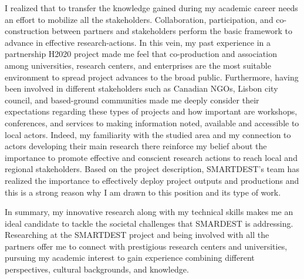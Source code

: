\begin{comment}


My expertise in Geographic Information Science (GIScience), planning, and social theory allow me to teach courses in digital geographies, qualitative and quantitative methods, and GIS, as well as fundamentals in programming language such as SQL and Python. Mixing methods and making associations between cutting-edge tools and theoretical frameworks, my classrooms shift between pragmatic and theoretical perspectives to be able to keep simple and complex overviews needed for the geographical inquiry. Furthermore, I have experience supervising students, helping them to reach their maximum potential by inspiring guiding them through an independent research project.\par

\end{comment}


I realized that to transfer the knowledge gained during my academic career needs an effort to mobilize all the stakeholders. Collaboration, participation, and co-construction between partners and stakeholders perform the basic framework to advance in effective research-actions. In this vein, my past experience in a partnership H2020 project made me feel that co-production and association among universities, research centers, and enterprises are the most suitable environment to spread project advances to the broad public. Furthermore, having been involved in different stakeholders such as Canadian NGOs, Lisbon city council, and based-ground communities made me deeply consider their expectations regarding these types of projects and how important are workshops, conferences, and services to making information noted, available and accessible to local actors. Indeed, my familiarity with the studied area and my connection to actors developing their main research there reinforce my belief about the importance to promote effective and conscient research actions to reach local and regional stakeholders. Based on the project description, SMARTDEST's team has realized the importance to effectively deploy project outputs and productions and this is a strong reason why I am drawn to this position and its type of work.\par


In summary, my innovative research along with my technical skills makes me an ideal candidate to tackle the societal challenges that SMARDEST is addressing. Researching at the SMARTDEST project and being involved with all the partners offer me to connect with prestigious research centers and universities, pursuing my academic interest to gain experience combining different perspectives, cultural backgrounds, and knowledge.\par

